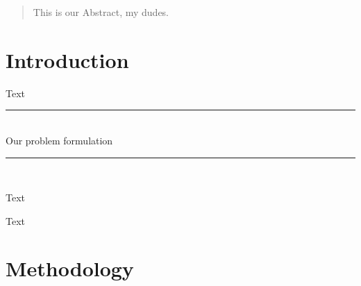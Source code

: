 \documentclass[12p]{article}
\newcommand{\SlimHRule}{\rule{\linewidth}{0.25mm}} %
\begin{document}

\begin{abstract}
\thispagestyle{plain} %
    This is our Abstract, my dudes.

\end{abstract}

\newpage


\tableofcontents %
\thispagestyle{plain} %

\newpage %


\section{Introduction}

Text

\begin{center}
    \vspace{1em}
    \SlimHRule\\[0.1cm]
    \Large{Our problem formulation}
    \SlimHRule\\[0.1cm]
    \vspace{1em}
\end{center}

Text \medskip

Text


\newpage
\section{Methodology} \label{Methodology}
\end{document}
